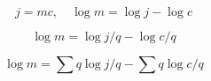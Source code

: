 
\begin{equation*}
j = m c, \quad \log m = \log j- \log c
\end{equation*}

\begin{equation*}
\log m = \log j/q - \log c/q
\end{equation*}

\begin{equation*}
\log m = \sum q \log j/q - \sum q \log c/q
\end{equation*}

\eframe
